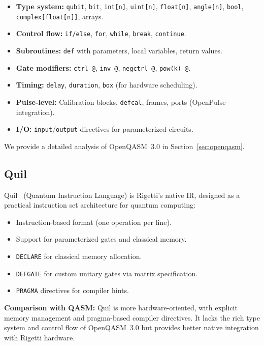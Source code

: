 \documentclass[journal]{IEEEtran}
\begin{document}
\begin{itemize}
    \item \textbf{Type system:} \texttt{qubit}, \texttt{bit}, \texttt{int[n]}, \texttt{uint[n]}, \texttt{float[n]}, \texttt{angle[n]}, \texttt{bool}, \texttt{complex[float[n]]}, arrays.
    \item \textbf{Control flow:} \texttt{if/else}, \texttt{for}, \texttt{while}, \texttt{break}, \texttt{continue}.
    \item \textbf{Subroutines:} \texttt{def} with parameters, local variables, return values.
    \item \textbf{Gate modifiers:} \texttt{ctrl @}, \texttt{inv @}, \texttt{negctrl @}, \texttt{pow(k) @}.
    \item \textbf{Timing:} \texttt{delay}, \texttt{duration}, \texttt{box} (for hardware scheduling).
    \item \textbf{Pulse-level:} Calibration blocks, \texttt{defcal}, frames, ports (OpenPulse integration).
    \item \textbf{I/O:} \texttt{input}/\texttt{output} directives for parameterized circuits.
\end{itemize}

We provide a detailed analysis of OpenQASM~3.0 in Section~\ref{sec:openqasm}.

\subsection{Quil}

Quil~\cite{smith2016practical} (Quantum Instruction Language) is Rigetti's native IR, designed as a practical instruction set architecture for quantum computing:
\begin{itemize}
    \item Instruction-based format (one operation per line).
    \item Support for parameterized gates and classical memory.
    \item \texttt{DECLARE} for classical memory allocation.
    \item \texttt{DEFGATE} for custom unitary gates via matrix specification.
    \item \texttt{PRAGMA} directives for compiler hints.
\end{itemize}

\textbf{Comparison with QASM:} Quil is more hardware-oriented, with explicit memory management and pragma-based compiler directives. It lacks the rich type system and control flow of OpenQASM~3.0 but provides better native integration with Rigetti hardware.
\end{document}

